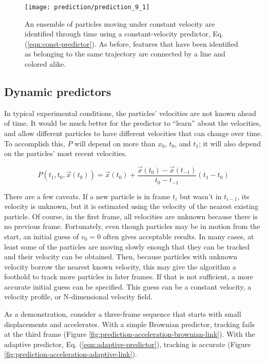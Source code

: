    \begin{figure}
    \centering
    \texttt{[image: prediction/prediction\_9\_1]}
    \caption[An ensemble of particles moving under constant velocity are identified through time using a constant-velocity predictor.]{\label{fig:prediction-const-const-link}An ensemble of particles moving under constant velocity are identified through time using a constant-velocity predictor, Eq. (\ref{eqn:const-predictor}). As before, features that have been identified as belonging to the same trajectory are connected by a line and colored alike. }
    \end{figure}

\subsection{Dynamic predictors}\label{dynamic-predictors}

In typical experimental conditions, the particles' velocities are not known ahead of time. It would be much better for the predictor to ``learn'' about
the velocities, and allow different particles to have different
velocities that can change over time. To accomplish this, $P$ will depend on more than $x_0$, $t_0$, and $t_1$; it will also depend on the particles' most recent velocities.

\begin{equation}
\label{eqn:adaptive-predictor}
P(t_1, t_0, \vec x(t_0)) = \vec x(t_0) + \frac{\vec x(t_0) - \vec x(t_{-1})}{t_0 - t_{-1}} (t_1 - t_0)
\end{equation}

There are a few caveats.
  If a new particle is in frame $t_i$ but wasn't in $t_{i-1}$, its velocity is unknown, but it is estimated using the velocity of the nearest existing particle. Of course, in the first frame, all
  velocities are unknown because
  there is no previous frame. Fortunately, even though particles may be in motion from the start, an initial guess
  of $v_0 = 0$ often gives acceptable results. In many cases, at
  least some of the particles are moving slowly enough that they can be
  tracked and their velocity can be obtained. Then, because particles with
  unknown velocity borrow the nearest known velocity, this may give the algorithm a foothold to track more particles
  in later frames. If that is not sufficient, a more accurate initial guess can be specified. This guess can be a constant velocity, a velocity profile, or N-dimensional velocity field.

As a demonstration, consider a three-frame sequence that starts
with small displacements and accelerates. With a simple Brownian predictor, tracking fails at the third frame (Figure \ref{fig:prediction-acceleration-brownian-link}). With the adaptive predictor, Eq. (\ref{eqn:adaptive-predictor}), tracking is accurate (Figure \ref{fig:prediction-acceleration-adaptive-link}).


